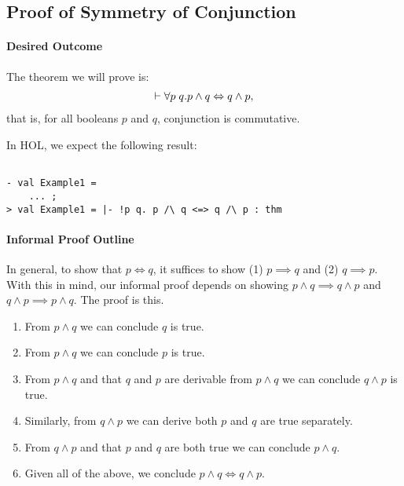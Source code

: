 \subsection{Proof of Symmetry of Conjunction}
\label{sec:conj-proof}

\paragraph*{Desired Outcome}

The theorem we will prove is:
\begin{gather*}
  \vdash {\forall p\;q.p \wedge q \Leftrightarrow q \wedge p},
\end{gather*}
that is, for all booleans $p$ and $q$, conjunction is commutative.

In HOL, we expect the following result:
\begin{session}
\begin{verbatim}

- val Example1 =
    ... ;
> val Example1 = |- !p q. p /\ q <=> q /\ p : thm
\end{verbatim}
\end{session}

\paragraph*{Informal Proof Outline}

In general, to show that $p \Leftrightarrow q$, it suffices to show
(1) $p \implies q$ and (2) $q \implies p$. With this in mind, our
informal proof depends on showing $p \wedge q \implies q \wedge p$ and
$q \wedge p \implies p \wedge q$. The proof is this.
\begin{enumerate}
\item From $p \wedge q$ we can conclude $q$ is true.
\item From $p \wedge q$ we can conclude $p$ is true.
\item From $p \wedge q$ and that $q$ and $p$ are derivable from $p
  \wedge q$ we can conclude $q \wedge p$ is true.
\item Similarly, from $q \wedge p$ we can derive both $p$ and $q$ are
  true separately.
\item From $q \wedge p$ and that $p$ and $q$ are both true we can
  conclude $p \wedge q$.
\item Given all of the above, we conclude $p \wedge q \Leftrightarrow
  q \wedge p$.
\end{enumerate}

